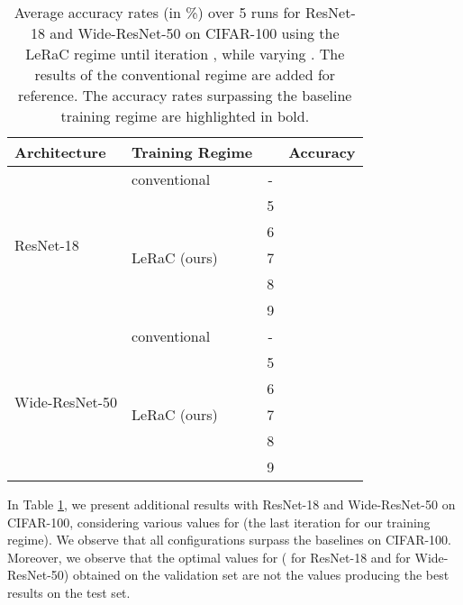 \documentclass[10pt,twocolumn,letterpaper]{article}
\begin{document}
\begin{table}[t]
  \small{
\begin{center}
  \begin{tabular}{llcc}
    \toprule
    Architecture  & Training Regime   &   & Accuracy \\
    \midrule
     \multirow{6}{*}{\vspace{-0.15cm}ResNet-18}              & conventional           & - &  \\
     \cmidrule{2-4}
                                &                          & 5  & \\
                                &                           & 6  & \\
                                &                LeRaC (ours)           & 7  & \\
                                &                          & 8  & \\
                                &                         & 9  & \\
    \midrule
    \multirow{6}{*}{\vspace{-0.15cm}Wide-ResNet-50}              & conventional         & - &  \\
    \cmidrule{2-4}
                                 &                           & 5  & \\
                                &                           & 6  & \\   
                                               & LeRaC (ours)           & 7  & \\
                                &                          & 8  & \\
                                &                          & 9  & \\
    \bottomrule
  \end{tabular}
    \end{center}
    }
      \vspace{-0.6cm}
    \caption{Average accuracy rates (in \%) over 5 runs for ResNet-18 and Wide-ResNet-50 on CIFAR-100 using the LeRaC regime until iteration , while varying . The results of the conventional regime are added for reference. The accuracy rates surpassing the baseline training regime are highlighted in bold.}
  \label{tab_var_k}
\end{table}

In Table \ref{tab_var_k}, we present additional results with ResNet-18 and Wide-ResNet-50 on CIFAR-100, considering various values for  (the last iteration for our training regime). We observe that all configurations surpass the baselines on CIFAR-100. Moreover, we observe that the optimal values for  ( for ResNet-18 and  for Wide-ResNet-50) obtained on the validation set are not the values producing the best results on the test set. 
\end{document}
